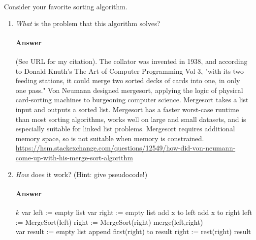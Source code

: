 \documentclass{article}
\begin{document}
Consider your favorite sorting algorithm.
\begin{enumerate}
    \item \emph{What} is the problem that this algorithm solves?

        \paragraph{Answer}{(See URL for my citation). The collator was invented in 1938, and according to Donald Knuth's The Art of Computer Programming Vol 3, "with its two feeding stations, it could merge two sorted decks of cards into one, in only one pass." Von Neumann designed mergesort, applying the logic of physical card-sorting machines to burgeoning computer science. Mergesort takes a list input and outputs a sorted list. Mergesort has a faster worst-case runtime than most sorting algorithms, works well on large and small datasets, and is especially suitable for linked list problems. Mergesort requires additional memory space, so is not suitable when memory is constrained.}
\url{https://hsm.stackexchange.com/questions/12549/how-did-von-neumann-come-up-with-his-merge-sort-algorithm}

    \item \emph{How} does it work? (Hint: give pseudocode!)

        \paragraph{Answer}
        \begin{algorithmic}
	 
	    \State \Return $k$
	\EndIf
	\State var left := empty list
	\State var right := empty list
	\State add x to left
	\Else
	\State add x to right
	\EndIf
	\EndFor
	\State left := MergeSort(left)
	\State right := MergeSort(right)
	\State \Return merge(left,right)
	\EndFunction
	\\
	\State var result := empty list
	\Else
	\State append first(right) to result
	\State right := rest(right)
	\EndIf
	\EndWhile
	\EndWhile
	\EndWhile
	\State \Return result
	\EndFunction 
	\end{algorithmic}


\end{enumerate}
\end{document}
